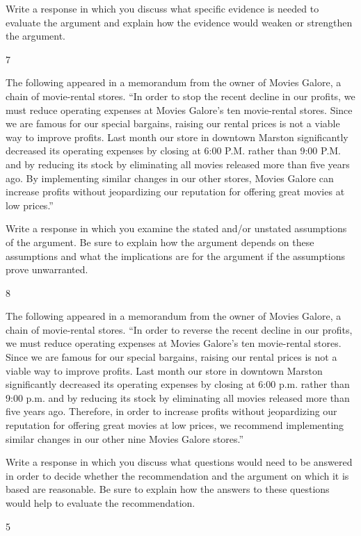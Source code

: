 \documentclass[]{article}
\begin{document}
Write a response in which you discuss what specific evidence is needed
to evaluate the argument and explain how the evidence would weaken or
strengthen the argument.

7

The following appeared in a memorandum from the owner of Movies Galore,
a chain of movie-rental stores. ``In order to stop the recent decline in
our profits, we must reduce operating expenses at Movies Galore's ten
movie-rental stores. Since we are famous for our special bargains,
raising our rental prices is not a viable way to improve profits. Last
month our store in downtown Marston significantly decreased its
operating expenses by closing at 6:00 P.M. rather than 9:00 P.M. and by
reducing its stock by eliminating all movies released more than five
years ago. By implementing similar changes in our other stores, Movies
Galore can increase profits without jeopardizing our reputation for
offering great movies at low prices.''

Write a response in which you examine the stated and/or unstated
assumptions of the argument. Be sure to explain how the argument depends
on these assumptions and what the implications are for the argument if
the assumptions prove unwarranted.

8

The following appeared in a memorandum from the owner of Movies Galore,
a chain of movie-rental stores. ``In order to reverse the recent decline
in our profits, we must reduce operating expenses at Movies Galore's ten
movie-rental stores. Since we are famous for our special bargains,
raising our rental prices is not a viable way to improve profits. Last
month our store in downtown Marston significantly decreased its
operating expenses by closing at 6:00 p.m. rather than 9:00 p.m. and by
reducing its stock by eliminating all movies released more than five
years ago. Therefore, in order to increase profits without jeopardizing
our reputation for offering great movies at low prices, we recommend
implementing similar changes in our other nine Movies Galore stores.''

Write a response in which you discuss what questions would need to be
answered in order to decide whether the recommendation and the argument
on which it is based are reasonable. Be sure to explain how the answers
to these questions would help to evaluate the recommendation.

5
\end{document}

